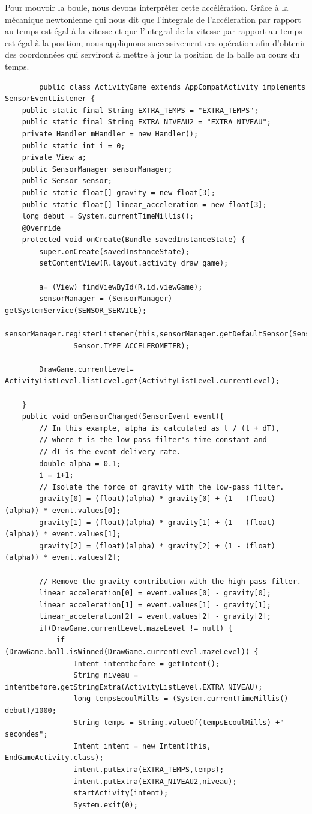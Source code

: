 \documentclass{article}
\begin{document}
\begin{itemize}
    Pour mouvoir la boule, nous devons interpréter cette accélération. Grâce à la mécanique newtonienne qui nous dit que l'integrale de l'accéleration par rapport au temps est égal à la vitesse et que l'integral de la vitesse par rapport au temps est égal à la position, nous appliquons successivement ces opération afin d'obtenir des coordonnées qui serviront à mettre à jour la position de la balle au cours du temps.
    \begin{verbatim}
        public class ActivityGame extends AppCompatActivity implements SensorEventListener {
    public static final String EXTRA_TEMPS = "EXTRA_TEMPS";
    public static final String EXTRA_NIVEAU2 = "EXTRA_NIVEAU";
    private Handler mHandler = new Handler();
    public static int i = 0;
    private View a;
    public SensorManager sensorManager;
    public Sensor sensor;
    public static float[] gravity = new float[3];
    public static float[] linear_acceleration = new float[3];
    long debut = System.currentTimeMillis();
    @Override
    protected void onCreate(Bundle savedInstanceState) {
        super.onCreate(savedInstanceState);
        setContentView(R.layout.activity_draw_game);

        a= (View) findViewById(R.id.viewGame);
        sensorManager = (SensorManager) getSystemService(SENSOR_SERVICE);
        sensorManager.registerListener(this,sensorManager.getDefaultSensor(Sensor.TYPE_ORIENTATION),
                Sensor.TYPE_ACCELEROMETER);

        DrawGame.currentLevel= ActivityListLevel.listLevel.get(ActivityListLevel.currentLevel);

    }
    public void onSensorChanged(SensorEvent event){
        // In this example, alpha is calculated as t / (t + dT),
        // where t is the low-pass filter's time-constant and
        // dT is the event delivery rate.
        double alpha = 0.1;
        i = i+1;
        // Isolate the force of gravity with the low-pass filter.
        gravity[0] = (float)(alpha) * gravity[0] + (1 - (float)(alpha)) * event.values[0];
        gravity[1] = (float)(alpha) * gravity[1] + (1 - (float)(alpha)) * event.values[1];
        gravity[2] = (float)(alpha) * gravity[2] + (1 - (float)(alpha)) * event.values[2];

        // Remove the gravity contribution with the high-pass filter.
        linear_acceleration[0] = event.values[0] - gravity[0];
        linear_acceleration[1] = event.values[1] - gravity[1];
        linear_acceleration[2] = event.values[2] - gravity[2];
        if(DrawGame.currentLevel.mazeLevel != null) {
            if (DrawGame.ball.isWinned(DrawGame.currentLevel.mazeLevel)) {
                Intent intentbefore = getIntent();
                String niveau = intentbefore.getStringExtra(ActivityListLevel.EXTRA_NIVEAU);
                long tempsEcoulMills = (System.currentTimeMillis() - debut)/1000;
                String temps = String.valueOf(tempsEcoulMills) +" secondes";
                Intent intent = new Intent(this, EndGameActivity.class);
                intent.putExtra(EXTRA_TEMPS,temps);
                intent.putExtra(EXTRA_NIVEAU2,niveau);
                startActivity(intent);
                System.exit(0);


\end{verbatim}
\end{itemize}
\end{document}
